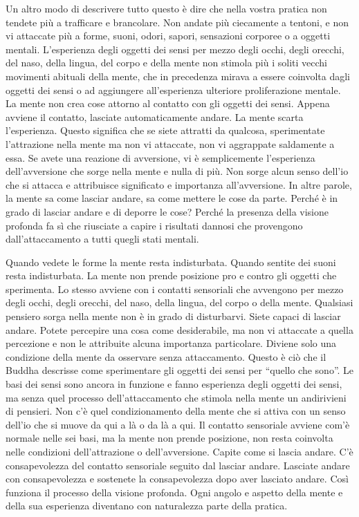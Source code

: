 Un altro modo di descrivere tutto questo è dire che nella vostra pratica
non tendete più a trafficare e brancolare. Non andate più ciecamente a
tentoni, e non vi attaccate più a forme, suoni, odori, sapori,
sensazioni corporee o a oggetti mentali. L'esperienza degli oggetti dei
sensi per mezzo degli occhi, degli orecchi, del naso, della lingua, del
corpo e della mente non stimola più i soliti vecchi movimenti abituali
della mente, che in precedenza mirava a essere coinvolta dagli oggetti
dei sensi o ad aggiungere all'esperienza ulteriore proliferazione
mentale. La mente non crea cose attorno al contatto con gli oggetti dei
sensi. Appena avviene il contatto, lasciate automaticamente andare. La
mente scarta l'esperienza. Questo significa che se siete attratti da
qualcosa, sperimentate l'attrazione nella mente ma non vi attaccate, non
vi aggrappate saldamente a essa. Se avete una reazione di avversione, vi
è semplicemente l'esperienza dell'avversione che sorge nella mente e
nulla di più. Non sorge alcun senso dell'io che si attacca e attribuisce
significato e importanza all'avversione. In altre parole, la mente sa
come lasciar andare, sa come mettere le cose da parte. Perché è in grado
di lasciar andare e di deporre le cose? Perché la presenza della visione
profonda fa sì che riusciate a capire i risultati dannosi che provengono
dall'attaccamento a tutti quegli stati mentali.

Quando vedete le forme la mente resta indisturbata. Quando sentite dei
suoni resta indisturbata. La mente non prende posizione pro e contro gli
oggetti che sperimenta. Lo stesso avviene con i contatti sensoriali che
avvengono per mezzo degli occhi, degli orecchi, del naso, della lingua,
del corpo o della mente. Qualsiasi pensiero sorga nella mente non è in
grado di disturbarvi. Siete capaci di lasciar andare. Potete percepire
una cosa come desiderabile, ma non vi attaccate a quella percezione e
non le attribuite alcuna importanza particolare. Diviene solo una
condizione della mente da osservare senza attaccamento. Questo è ciò che
il Buddha descrisse come sperimentare gli oggetti dei sensi per ``quello
che sono''. Le basi dei sensi sono ancora in funzione e fanno esperienza
degli oggetti dei sensi, ma senza quel processo dell'attaccamento che
stimola nella mente un andirivieni di pensieri. Non c'è quel
condizionamento della mente che si attiva con un senso dell'io che si
muove da qui a là o da là a qui. Il contatto sensoriale avviene com'è
normale nelle sei basi, ma la mente non prende posizione, non resta
coinvolta nelle condizioni dell'attrazione o dell'avversione. Capite
come si lascia andare. C'è consapevolezza del contatto sensoriale
seguito dal lasciar andare. Lasciate andare con consapevolezza e
sostenete la consapevolezza dopo aver lasciato andare. Così funziona il
processo della visione profonda. Ogni angolo e aspetto della mente e
della sua esperienza diventano con naturalezza parte della pratica.

